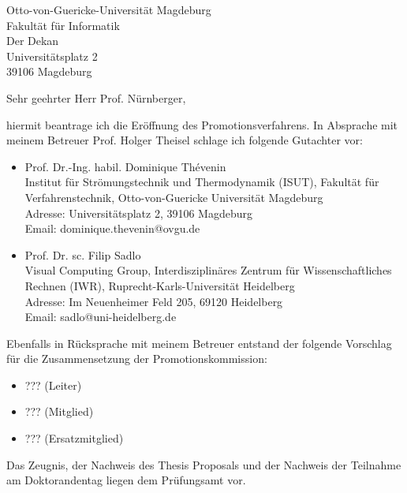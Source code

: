 \documentclass{scrlttr2}
\begin{document}
\begin{letter}{
    Otto-von-Guericke-Universität Magdeburg\\
    Fakultät für Informatik\\
    Der Dekan\\
    \vspace{0.5\baselineskip}
    Universitätsplatz 2\\
    39106 Magdeburg}

    \opening{Sehr geehrter Herr Prof. Nürnberger,}

    hiermit beantrage ich die Eröffnung des Promotionsverfahrens. In Absprache
    mit meinem Betreuer Prof. Holger Theisel schlage ich folgende Gutachter vor:

    \begin{itemize}
        \item Prof. Dr.-Ing. habil. Dominique Thévenin\\
              Institut für Strömungstechnik und Thermodynamik (ISUT), Fakultät
              für Verfahrenstechnik, Otto-von-Guericke Universität Magdeburg\\
              Adresse: Universitätsplatz 2, 39106 Magdeburg\\
              Email: dominique.thevenin@ovgu.de
        \item Prof. Dr. sc. Filip Sadlo\\
              Visual Computing Group, Interdisziplinäres Zentrum für
              Wissenschaftliches Rechnen (IWR), Ruprecht-Karls-Universität
              Heidelberg\\
              Adresse: Im Neuenheimer Feld 205, 69120 Heidelberg\\
              Email: sadlo@uni-heidelberg.de
    \end{itemize}

    Ebenfalls in Rücksprache mit meinem Betreuer entstand der folgende Vorschlag
    für die Zusammensetzung der Promotionskommission:

    \begin{itemize}
        \item ??? (Leiter)
        \item ??? (Mitglied)
        \item ??? (Ersatzmitglied)
    \end{itemize}

    Das Zeugnis, der Nachweis des Thesis Proposals und der Nachweis der
    Teilnahme am Doktorandentag liegen dem Prüfungsamt vor.


\end{letter}
\end{document}
